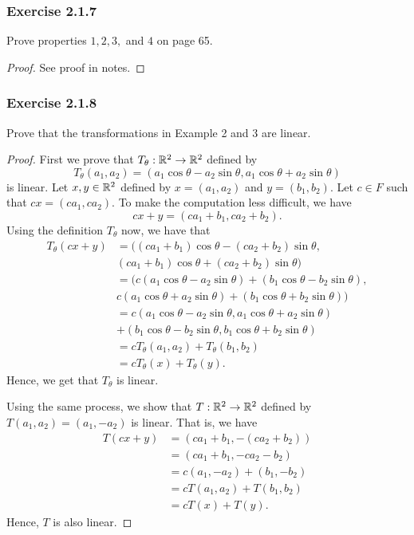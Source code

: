 \subsubsection{Exercise 2.1.7} Prove properties \( 1,2,3, \) and \( 4 \) on page 65.
\begin{proof}
See proof in notes.
\end{proof}

\subsubsection{Exercise 2.1.8} Prove that the transformations in Example 2 and 3 are linear.
\begin{proof}
    First we prove that \( T_{\theta}: \mathbb{R}^{2} \to \mathbb{R}^{2} \) defined by 
    \[  T_{\theta}(a_{1}, a_{2}) = (a_{1}\cos \theta - a_{2} \sin \theta, a_{1} \cos \theta + a_{2} \sin \theta) \]
    is linear. Let \( x,y \in \mathbb{R}^{2}  \) defined by \( x = (a_{1}, a_{2}) \) and \( y = (b_{1}, b_{2}) \). Let \( c \in F  \) such that \( cx = (ca_{1}, ca_{2}) \). To make the computation less difficult, we have
    \[  cx + y = (ca_{1} + b_{1}, ca_{2} + b_{2}). \]
    Using the definition \( T_{\theta} \) now, we have that 
    \begin{align*}
        T_{\theta}(cx + y) &= ((ca_{1} + b_{1})\cos \theta - (ca_{2} + b_{2}) \sin \theta,  \\
                           &(ca_{1} + b_{1}) \cos \theta + (ca_{2} + b_{2}) \sin \theta ) \\
                           &= (c (a_{1}\cos \theta  - a_{2} \sin \theta) + (b_{1} \cos \theta - b_{2} \sin \theta ), \\
                           &c ( a_{1} \cos \theta + a_{2} \sin \theta ) + (b_{1} \cos \theta + b_{2} \sin \theta)           ) \\
                           &= c (a_{1} \cos \theta - a_{2} \sin \theta, a_{1} \cos \theta + a_{2} \sin \theta)  \\
                           &+ (b_{1} \cos \theta - b_{2} \sin \theta , b_{1} \cos \theta + b_{2} \sin \theta) \\
                           &= c T_{\theta}(a_{1}, a_{2}) + T_{\theta}(b_{1}, b_{2}) \\
                           &= c T_{\theta}(x) + T_{\theta}(y).
    \end{align*}
    Hence, we get that \( T_{\theta} \) is linear.

    Using the same process, we show that \( T: \mathbb{R}^{2} \to \mathbb{R}^{2}  \) defined by \( T(a_{1}, a_{2}) = (a_{1}, - a_{2})\) is linear. That is, we have
    \begin{align*}
        T(cx + y) &= (ca_{1} + b_{1}, - (ca_{2} + b_{2})) \\
                  &= (ca_{1} + b_{1}, -ca_{2} - b_{2}) \\ 
                  &= c(a_{1}, -a_{2}) + (b_{1}, -b_{2}) \\
                  &= c T(a_{1}, a_{2}) + T(b_{1}, b_{2}) \\
                  &= cT(x) + T(y).
    \end{align*}
    Hence, \( T  \) is also linear.
\end{proof}

